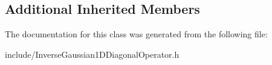 \subsection*{Additional Inherited Members}


The documentation for this class was generated from the following file\+:\begin{DoxyCompactItemize}
\item 
include/Inverse\+Gaussian1\+D\+Diagonal\+Operator.\+h\end{DoxyCompactItemize}
